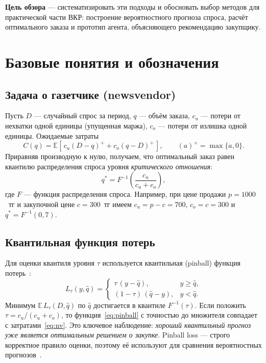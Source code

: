 \documentclass[12pt,a4paper]{article}
\newcommand{\E}{\mathbb{E}}
\newcommand{\pos}[1]{\left(#1\right)^{+}}
\begin{document}
\textbf{Цель обзора} --- систематизировать эти подходы и обосновать
выбор методов для практической части ВКР: построение вероятностного
прогноза спроса, расчёт оптимального заказа и прототип агента,
объясняющего рекомендацию закупщику.

\section{Базовые понятия и обозначения}

\subsection{Задача о газетчике (newsvendor)}

Пусть $D$ --- случайный спрос за период, $q$ --- объём заказа,
$c_u$ --- потери от нехватки одной единицы (упущенная маржа),
$c_o$ --- потери от излишка одной единицы. Ожидаемые затраты
\begin{equation}\label{eq:nv}
  C(q) = \E\!\left[\, c_u \pos{D - q} + c_o \pos{q - D} \,\right],
  \qquad \pos{a} = \max\{a, 0\}.
\end{equation}
Приравняв производную к нулю, получаем, что оптимальный заказ
равен квантилю распределения спроса уровня \emph{критического
отношения}:
\begin{equation}\label{eq:cr}
  q^{*} = F^{-1}\!\left(\frac{c_u}{c_u + c_o}\right),
\end{equation}
где $F$ --- функция распределения спроса. Например, при цене
продажи $p = 1000$~тг и закупочной цене $c = 300$~тг имеем
$c_u = p - c = 700$, $c_o = c = 300$ и $q^{*} = F^{-1}(0{,}7)$.

\subsection{Квантильная функция потерь}

Для оценки квантиля уровня $\tau$ используется квантильная
(pinball) функция потерь~\cite{koenker1978quantiles}:
\begin{equation}\label{eq:pinball}
  L_\tau(y, \hat q) =
  \begin{cases}
    \tau\,(y - \hat q), & y \ge \hat q,\\[2pt]
    (1-\tau)\,(\hat q - y), & y < \hat q.
  \end{cases}
\end{equation}
Минимум $\E\,L_\tau(D, \hat q)$ по $\hat q$ достигается в квантиле
$F^{-1}(\tau)$. Если положить $\tau = c_u/(c_u+c_o)$, то
функция~\eqref{eq:pinball} с точностью до множителя совпадает
с затратами~\eqref{eq:nv}. Это ключевое наблюдение: \emph{хороший
квантильный прогноз уже является оптимальным решением о закупке}.
Pinball loss --- строго корректное правило оценки, поэтому её
используют для сравнения вероятностных прогнозов~\cite{gneiting2007scoring,makridakis2022m5}.
\end{document}
